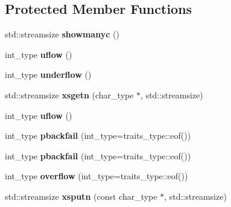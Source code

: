 \subsection*{Protected Member Functions}
\begin{DoxyCompactItemize}
\item 
\mbox{\label{structtest_a7f6d74560cd06f3acb63894297ac6545}} 
std\+::streamsize {\bfseries showmanyc} ()
\item 
\mbox{\label{structtest_aa50ad3007e9405fc51ee89cb28536406}} 
int\+\_\+type {\bfseries uflow} ()
\item 
\mbox{\label{structtest_aaf1d305e764cf4bf0a89995c86271a2a}} 
int\+\_\+type {\bfseries underflow} ()
\item 
\mbox{\label{structtest_a9aed484dfbe555120ee5c82390278135}} 
std\+::streamsize {\bfseries xsgetn} (char\+\_\+type $\ast$, std\+::streamsize)
\item 
\mbox{\label{structtest_aa50ad3007e9405fc51ee89cb28536406}} 
int\+\_\+type {\bfseries uflow} ()
\item 
\mbox{\label{structtest_a3466016f58b7734c41b2f3e3874534f5}} 
int\+\_\+type {\bfseries pbackfail} (int\+\_\+type=traits\+\_\+type\+::eof())
\item 
\mbox{\label{structtest_a3466016f58b7734c41b2f3e3874534f5}} 
int\+\_\+type {\bfseries pbackfail} (int\+\_\+type=traits\+\_\+type\+::eof())
\item 
\mbox{\label{structtest_a26d4fc786cd822942d6425f7f81a56a5}} 
int\+\_\+type {\bfseries overflow} (int\+\_\+type=traits\+\_\+type\+::eof())
\item 
\mbox{\label{structtest_af4bd9984bfc13fbd801a8d81a7a59427}} 
std\+::streamsize {\bfseries xsputn} (const char\+\_\+type $\ast$, std\+::streamsize)
\end{DoxyCompactItemize}


